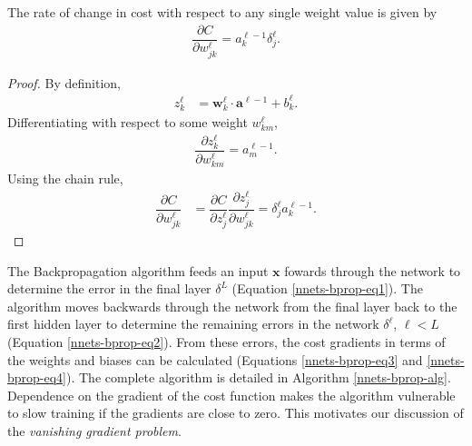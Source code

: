 \begin{lemma}
	The rate of change in cost with respect to any single weight value is given by
	\begin{align}\label{nnets-bprop-eq4}
		\dfrac{\partial C}{\partial w_{jk}^\ell} = a_k^{\ell-1}\delta_j^\ell.
	\end{align}
\end{lemma}
\begin{proof}
	By definition,
	\begin{align*}
		z_k^\ell & = \mathbf{w}_k^\ell\cdot\mathbf{a}^{\ell-1} + b_k^\ell.
	\end{align*}
	Differentiating with respect to some weight $w_{km}^\ell$,
	\begin{align*}
		\dfrac{\partial z_k^\ell}{\partial w_{km}^\ell} = a_m^{\ell-1}.
	\end{align*}
	Using the chain rule,
	\begin{align*}	
		\dfrac{\partial C}{\partial w_{jk}^\ell} & = \dfrac{\partial C}{\partial z_j^\ell}\dfrac{\partial z_j^\ell}{\partial w_{jk}^\ell} = \delta_j^\ell a_k^{\ell-1}.
	\end{align*}
\end{proof}


The Backpropagation algorithm feeds an input $\mathbf{x}$ fowards through the network to determine the error in the final layer $\delta^L$ (Equation \eqref{nnets-bprop-eq1}).  The algorithm moves backwards through the network from the final layer back to the first hidden layer to determine the remaining errors in the network $\delta^\ell$, $\ell < L$ (Equation \eqref{nnets-bprop-eq2}). From these errors, the cost gradients in terms of the weights and biases can be calculated (Equations \eqref{nnets-bprop-eq3} and \eqref{nnets-bprop-eq4}). The complete algorithm is detailed in Algorithm \ref{nnets-bprop-alg}. Dependence on the gradient of the cost function makes the algorithm vulnerable to slow training if the gradients are close to zero. This motivates our discussion of the \emph{vanishing gradient problem}.

